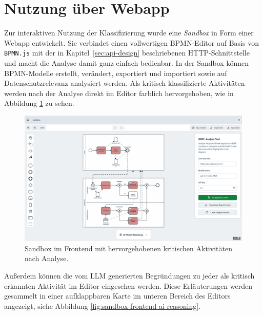 \section{Nutzung über Webapp}\label{sec:nutzung-uber-webapp}

Zur interaktiven Nutzung der Klassifizierung wurde eine \emph{Sandbox} in Form einer Webapp entwickelt. Sie verbindet einen vollwertigen \ac{BPMN}-Editor auf Basis von \texttt{BPMN.js} \cite{bpmn-js} mit der in Kapitel~\ref{sec:api-design} beschriebenen HTTP-Schnittstelle und macht die Analyse damit ganz einfach bedienbar. In der Sandbox können \ac{BPMN}-Modelle erstellt, verändert, exportiert und importiert sowie auf Datenschutzrelevanz analysiert werden. Als kritisch klassifizierte Aktivitäten werden nach der Analyse direkt im Editor farblich hervorgehoben, wie in Abbildung \ref{fig:sandbox-frontend-analyzed-model} zu sehen.

\begin{figure}
    \centering
    \includegraphics[width=\linewidth]{images/sandbox/sandbox-analyzed-model}
    \caption{Sandbox im Frontend mit hervorgehobenen kritischen Aktivitäten nach Analyse.}
    \label{fig:sandbox-frontend-analyzed-model}
\end{figure}

Außerdem können die vom \ac{LLM} generierten Begründungen zu jeder als kritisch erkannten Aktivität im Editor eingesehen werden. Diese Erläuterungen werden gesammelt in einer aufklappbaren Karte im unteren Bereich des Editors angezeigt, siehe Abbildung \ref{fig:sandbox-frontend-ai-reasoning}.


